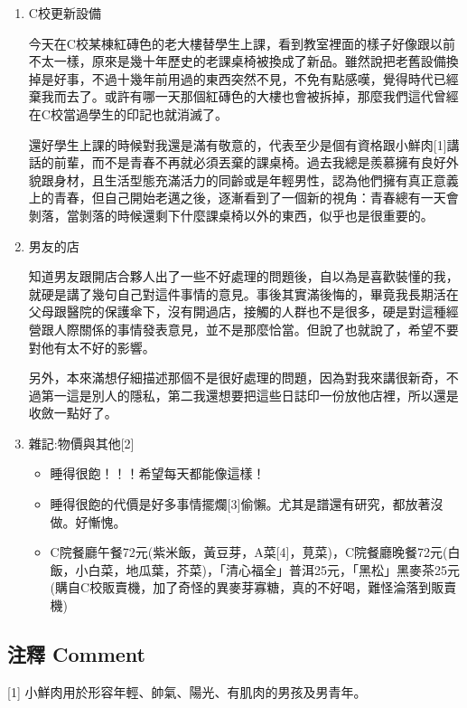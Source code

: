 \documentclass[a5paper, 12pt
]{book}
\providecommand{\tightlist}{%
  \setlength{\itemsep}{0pt}\setlength{\parskip}{0pt}}
\begin{document}
\begin{enumerate}
\def\labelenumi{\arabic{enumi}.}
\item
  C校更新設備

  今天在C校某棟紅磚色的老大樓替學生上課，看到教室裡面的樣子好像跟以前不太一樣，原來是幾十年歷史的老課桌椅被換成了新品。雖然說把老舊設備換掉是好事，不過十幾年前用過的東西突然不見，不免有點感嘆，覺得時代已經棄我而去了。或許有哪一天那個紅磚色的大樓也會被拆掉，那麼我們這代曾經在C校當過學生的印記也就消滅了。

  還好學生上課的時候對我還是滿有敬意的，代表至少是個有資格跟小鮮肉{[}1{]}講話的前輩，而不是青春不再就必須丟棄的課桌椅。過去我總是羨慕擁有良好外貌跟身材，且生活型態充滿活力的同齡或是年輕男性，認為他們擁有真正意義上的青春，但自己開始老邁之後，逐漸看到了一個新的視角：青春總有一天會剝落，當剝落的時候還剩下什麼課桌椅以外的東西，似乎也是很重要的。
\item
  男友的店

  知道男友跟開店合夥人出了一些不好處理的問題後，自以為是喜歡裝懂的我，就硬是講了幾句自己對這件事情的意見。事後其實滿後悔的，畢竟我長期活在父母跟醫院的保護傘下，沒有開過店，接觸的人群也不是很多，硬是對這種經營跟人際關係的事情發表意見，並不是那麼恰當。但說了也就說了，希望不要對他有太不好的影響。

  另外，本來滿想仔細描述那個不是很好處理的問題，因為對我來講很新奇，不過第一這是別人的隱私，第二我還想要把這些日誌印一份放他店裡，所以還是收斂一點好了。
\item
  雜記:物價與其他{[}2{]}

  \begin{itemize}
  \tightlist
  \item
    睡得很飽！！！希望每天都能像這樣！
  \item
    睡得很飽的代價是好多事情擺爛{[}3{]}偷懶。尤其是譜還有研究，都放著沒做。好慚愧。
  \item
    C院餐廳午餐72元(紫米飯，黃豆芽，A菜{[}4{]}，莧菜)，C院餐廳晚餐72元(白飯，小白菜，地瓜葉，芥菜)，「清心福全」普洱25元，「黑松」黑麥茶25元(購自C校販賣機，加了奇怪的異麥芽寡糖，真的不好喝，難怪淪落到販賣機)
  \end{itemize}
\end{enumerate}

\hypertarget{ux6ce8ux91cb-comment-23}{%
\subsection{注釋 Comment}\label{ux6ce8ux91cb-comment-23}}

{[}1{]} 小鮮肉用於形容年輕、帥氣、陽光、有肌肉的男孩及男青年。
\end{document}
